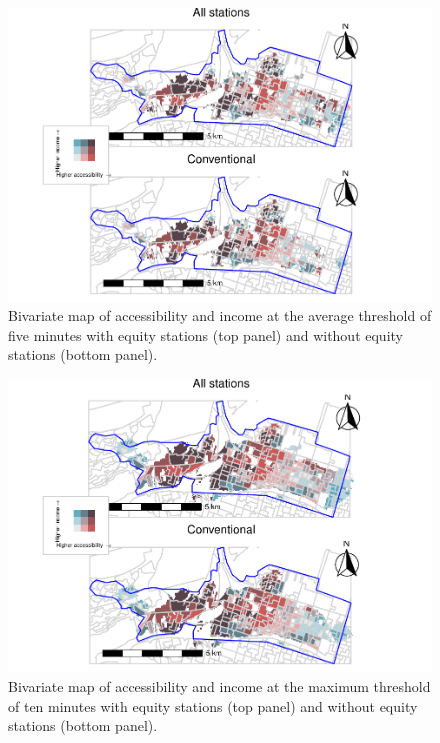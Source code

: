 \documentclass[]{elsarticle} %
\providecommand{\DIFaddbeginFL}{} %
\providecommand{\DIFaddendFL}{} %
\providecommand{\DIFdelbeginFL}{} %
\providecommand{\DIFdelendFL}{} %
\newcommand{\DIFscaledelfig}{0.5}
\newlength{\DIFdelgraphicswidth} %
\newlength{\DIFdelgraphicsheight} %
\newcommand{\DIFaddincludegraphics}[2][]{{\color{blue}\fbox{\DIFOincludegraphics[#1]{#2}}}} %
\newcommand{\DIFdelincludegraphics}[2][]{%
\sbox{\DIFdelgraphicsbox}{\DIFOincludegraphics[#1]{#2}}%
\settoboxwidth{\DIFdelgraphicswidth}{\DIFdelgraphicsbox} %
\settoboxtotalheight{\DIFdelgraphicsheight}{\DIFdelgraphicsbox} %
\scalebox{\DIFscaledelfig}{%
\parbox[b]{\DIFdelgraphicswidth}{\usebox{\DIFdelgraphicsbox}\\[-\baselineskip] \rule{\DIFdelgraphicswidth}{0em}}\llap{\resizebox{\DIFdelgraphicswidth}{\DIFdelgraphicsheight}{%
\setlength{\unitlength}{\DIFdelgraphicswidth}%
\begin{picture}(1,1)%
\thicklines\linethickness{2pt} %
{\color[rgb]{1,0,0}\put(0,0){\framebox(1,1){}}}%
{\color[rgb]{1,0,0}\put(0,0){\line( 1,1){1}}}%
{\color[rgb]{1,0,0}\put(0,1){\line(1,-1){1}}}%
\end{picture}%
}\hspace*{3pt}}} %
} %
\DeclareRobustCommand{\DIFaddbeginFL}{\DIFOaddbeginFL \let\includegraphics\DIFaddincludegraphics} %
\DeclareRobustCommand{\DIFaddendFL}{\DIFOaddendFL \let\includegraphics\DIFOincludegraphics} %
\DeclareRobustCommand{\DIFdelbeginFL}{\DIFOdelbeginFL \let\includegraphics\DIFdelincludegraphics} %
\DeclareRobustCommand{\DIFdelendFL}{\DIFOaddendFL \let\includegraphics\DIFOincludegraphics} %
\begin{document}
\begin{figure}
\DIFdelbeginFL %
\DIFdelendFL \DIFaddbeginFL \includegraphics[width=1.2\linewidth]{Bike-share-spatial-equity_files/figure-latex/figure-bi-map-threshold-5-1} \DIFaddendFL \caption{\label{fig-bivariate-map-threshold-5}Bivariate map of accessibility and income at the average threshold of five minutes with equity stations (top panel) and without equity stations (bottom panel).}\label{fig:figure-bi-map-threshold-5}
\end{figure}

\begin{figure}
\DIFdelbeginFL %
\DIFdelendFL \DIFaddbeginFL \includegraphics[width=1.2\linewidth]{Bike-share-spatial-equity_files/figure-latex/figure-bi-map-threshold-10-1} \DIFaddendFL \caption{\label{fig-bivariate-map-threshold-10}Bivariate map of accessibility and income at the maximum threshold of ten minutes with equity stations (top panel) and without equity stations (bottom panel).}\label{fig:figure-bi-map-threshold-10}
\end{figure}
\end{document}
